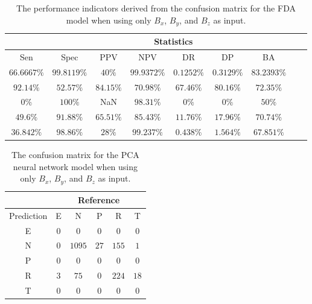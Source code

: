\begin{table}[!ht]
	\centering
	\begin{tabular}{|c|c|c|c|c|c|c|c|c|}
		\hline
		 & \multicolumn{7}{c|}{Statistics} \\ \hline
		Sen & Spec & PPV & NPV & DR & DP & BA \\ \hline
		$66.6667\%$ & $99.8119\%$ & $40\%$ & $99.9372\%$ & $0.1252\%$ & $0.3129\%$ & $83.2393\%$ \\ \hline
		$92.14\%$ & $52.57\%$ & $84.15\%$ & $70.98\%$ & $67.46\%$ & $80.16\%$ & $72.35\%$ \\ \hline
		$0\%$ & $100\%$ & NaN & $98.31\%$ & $0\%$ & $0\%$ & $50\%$ \\ \hline
		$49.6\%$ & $91.88\%$ & $65.51\%$ & $85.43\%$ & $11.76\%$ & $17.96\%$ & $70.74\%$ \\ \hline
		$36.842\%$ & $98.86\%$ & $28\%$ & $99.237\%$ & $0.438\%$ & $1.564\%$ & $67.851\%$ \\ \hline
	\end{tabular}
	\caption{The performance indicators derived from the confusion matrix for the FDA model when using only $B_{x}$, $B_{y}$, and $B_{z}$ as input.}
	\label{tab:cs:coord:fda}
\end{table}

\begin{table}[!ht]
	\centering
	\begin{tabular}{|c|c|c|c|c|c|}
		\hline
		 & \multicolumn{5}{|c|}{Reference} \\ \hline
		 Prediction & E & N & P & R & T \\ \hline
		 E & $0$ & $0$ & $0$ & $0$ & $0$ \\ \hline
		 N & $0$ & $1095$ & $27$ & $155$ & $1$ \\ \hline
		 P & $0$ & $0$ & $0$ & $0$ & $0$ \\ \hline
		 R & $3$ & $75$ & $0$ & $224$ & $18$ \\ \hline
		 T & $0$ & $0$ & $0$ & $0$ & $0$ \\ \hline
	\end{tabular}
	\caption{The confusion matrix for the PCA neural network model when using only $B_{x}$, $B_{y}$, and $B_{z}$ as input.}
	\label{tab:cm:coord:pcaNNet}
\end{table}

